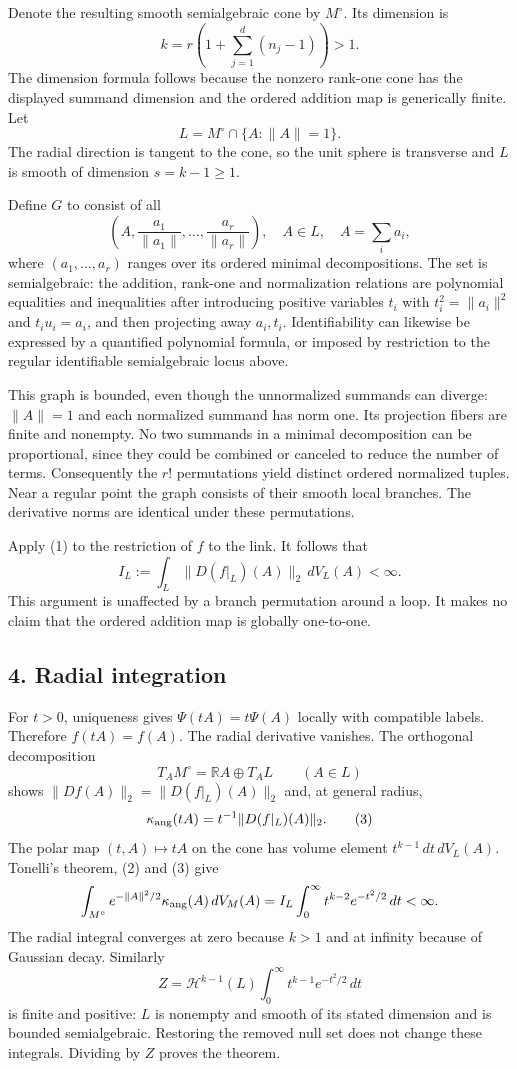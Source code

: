 \documentclass[
  11pt,
]{article}
\begin{document}
Denote the resulting smooth semialgebraic cone by \(M^\circ\). Its
dimension is \[
k=r\left(1+\sum_{j=1}^d(n_j-1)\right)>1.
\] The dimension formula follows because the nonzero rank-one cone has
the displayed summand dimension and the ordered addition map is
generically finite. Let \[
L=M^\circ\cap\{A:\|A\|=1\}.
\] The radial direction is tangent to the cone, so the unit sphere is
transverse and \(L\) is smooth of dimension \(s=k-1\ge1\).

Define \(G\) to consist of all \[
\left(A,\frac{a_1}{\|a_1\|},\ldots,\frac{a_r}{\|a_r\|}\right),
\quad A\in L,\quad A=\sum_i a_i,
\] where \((a_1,\ldots,a_r)\) ranges over its ordered minimal
decompositions. The set is semialgebraic: the addition, rank-one and
normalization relations are polynomial equalities and inequalities after
introducing positive variables \(t_i\) with \(t_i^2=\|a_i\|^2\) and
\(t_i u_i=a_i\), and then projecting away \(a_i,t_i\). Identifiability
can likewise be expressed by a quantified polynomial formula, or imposed
by restriction to the regular identifiable semialgebraic locus above.

This graph is bounded, even though the unnormalized summands can
diverge: \(\|A\|=1\) and each normalized summand has norm one. Its
projection fibers are finite and nonempty. No two summands in a minimal
decomposition can be proportional, since they could be combined or
canceled to reduce the number of terms. Consequently the \(r!\)
permutations yield distinct ordered normalized tuples. Near a regular
point the graph consists of their smooth local branches. The derivative
norms are identical under these permutations.

Apply (1) to the restriction of \(f\) to the link. It follows that \[
I_L:=\int_L\|D(f|_L)(A)\|_2\,dV_L(A)<\infty. \tag{2}
\] This argument is unaffected by a branch permutation around a loop. It
makes no claim that the ordered addition map is globally one-to-one.

\subsection{4. Radial integration}\label{radial-integration}

For \(t>0\), uniqueness gives \(\Psi(tA)=t\Psi(A)\) locally with
compatible labels. Therefore \(f(tA)=f(A)\). The radial derivative
vanishes. The orthogonal decomposition \[
T_A M^\circ=\mathbb R A\oplus T_A L\qquad(A\in L)
\] shows \(\|Df(A)\|_2=\|D(f|_L)(A)\|_2\) and, at general radius, \[
\kappa_{\rm ang}(tA)=t^{-1}\|D(f|_L)(A)\|_2. \tag{3}
\] The polar map \((t,A)\mapsto tA\) on the cone has volume element
\(t^{k-1}\,dt\,dV_L(A)\). Tonelli's theorem, (2) and (3) give \[
\int_{M^\circ}e^{-\|A\|^2/2}\kappa_{\rm ang}(A)\,dV_M(A)
= I_L\int_0^\infty t^{k-2}e^{-t^2/2}\,dt<\infty.
\] The radial integral converges at zero because \(k>1\) and at infinity
because of Gaussian decay. Similarly \[
Z=\mathcal H^{k-1}(L)\int_0^\infty t^{k-1}e^{-t^2/2}\,dt
\] is finite and positive: \(L\) is nonempty and smooth of its stated
dimension and is bounded semialgebraic. Restoring the removed null set
does not change these integrals. Dividing by \(Z\) proves the theorem.
\end{document}
